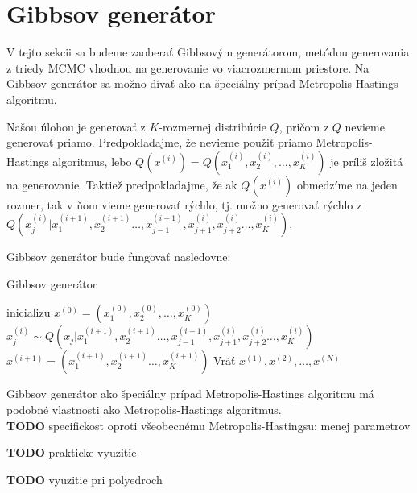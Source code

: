 \section{Gibbsov generátor}

V tejto sekcii sa budeme zaoberať Gibbsovým generátorom, metódou generovania z triedy MCMC vhodnou na generovanie vo viacrozmernom priestore. Na Gibbsov generátor sa možno dívať ako na špeciálny prípad Metropolis-Hastings algoritmu.

Našou úlohou je generovať z $K$-rozmernej distribúcie $Q$, pričom z $Q$ nevieme generovať priamo. Predpokladajme, že nevieme použiť priamo Metropolis-Hastings algoritmus, lebo $Q(x^{(i)})=Q(x^{(i)}_1, x^{(i)}_2, \dots, x^{(i)}_K)$ je príliš zložitá na generovanie. Taktiež predpokladajme, že ak $Q(x^{(i)})$ obmedzíme na jeden rozmer, tak v ňom vieme generovať rýchlo, tj. možno generovať rýchlo z $Q(x^{(i)}_j | x^{(i+1)}_1, x^{(i+1)}_2 \dots, x^{(i+1)}_{j-1}, x^{(i)}_{j+1}, x^{(i)}_{j+2} \dots, x^{(i)}_K)$.

Gibbsov generátor bude fungovať nasledovne:

\begin{algorithm}[H]
	\caption{Gibbsov generátor \cite{mcmc_intro_mackay}}
	\label{gibbs}
	\begin{algorithmic}[1]
		\State inicializu $x^{(0)} = (x^{(0)}_1, x^{(0)}_2, \dots, x^{(0)}_K)$
				\State $x^{(i)}_j \sim Q(x_j | x^{(i+1)}_1, x^{(i+1)}_2 \dots, x^{(i+1)}_{j-1}, x^{(i)}_{j+1}, x^{(i)}_{j+2} \dots, x^{(i)}_K)$
			\EndFor
			\State $x^{(i+1)}= (x^{(i+1)}_1, x^{(i+1)}_2 \dots, x^{(i+1)}_K)$
		\EndFor
		\State Vráť ${x^{(1)},x^{(2)},\dots,x^{(N)}}$
	\end{algorithmic}
\end{algorithm}

Gibbsov generátor ako špeciálny prípad Metropolis-Hastings algoritmu má podobné vlastnosti ako Metropolis-Hastings algoritmus.\\

\textbf{TODO} specifickost oproti všeobecnému Metropolis-Hastingsu: menej parametrov

\textbf{TODO} prakticke vyuzitie

\textbf{TODO} vyuzitie pri polyedroch


